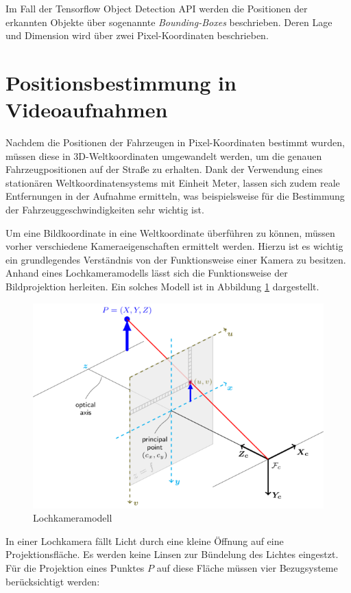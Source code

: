 Im Fall der Tensorflow Object Detection API werden die Positionen der erkannten Objekte über sogenannte
\textit{Bounding-Boxes} beschrieben. Deren Lage und Dimension wird über zwei Pixel-Koordinaten beschrieben.

\section{Positionsbestimmung in Videoaufnahmen}
\label{sec:grund_mapMatching}

Nachdem die Positionen der Fahrzeugen in Pixel-Koordinaten bestimmt wurden, müssen diese in 3D-Weltkoordinaten
umgewandelt werden, um die genauen Fahrzeugpositionen auf der Straße zu erhalten. Dank der Verwendung eines
stationären Weltkoordinatensystems mit Einheit Meter, lassen sich zudem reale Entfernungen
in der Aufnahme ermitteln, was beispielsweise für die Bestimmung der Fahrzeuggeschwindigkeiten sehr wichtig ist.

Um eine Bildkoordinate in eine Weltkoordinate überführen zu können, müssen vorher verschiedene Kameraeigenschaften
ermittelt werden. Hierzu ist es wichtig ein grundlegendes Verständnis von der Funktionsweise einer Kamera zu besitzen.
Anhand eines Lochkameramodells lässt sich die Funktionsweise der Bildprojektion herleiten.
Ein solches Modell ist in Abbildung \ref{fig:grund_pinhole_model} dargestellt.

\begin{figure}[H]
    \centering
    \includegraphics[width=0.55\linewidth]{resources/img/grundlagen/TrajectoryReconstruction/pinhole_camera_model}
    \caption[Lochkameramodell]{Lochkameramodell \cite[]{DevTeamOpenCV2018}}
    \label{fig:grund_pinhole_model}
\end{figure}

In einer Lochkamera fällt Licht durch eine kleine Öffnung auf eine Projektionsfläche. Es werden keine Linsen
zur Bündelung des Lichtes eingestzt. Für die Projektion eines Punktes $P$ auf diese Fläche müssen vier
Bezugsysteme berücksichtigt werden:

